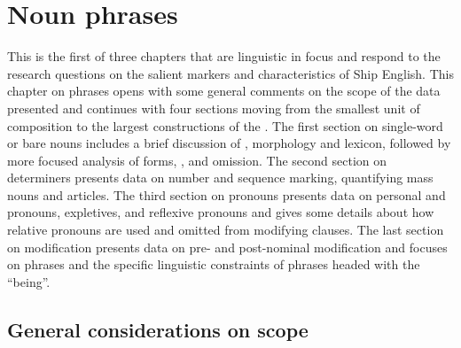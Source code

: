\chapter{{Noun phrases}}\label{sec:5}

This is the first of three chapters that are linguistic in focus and respond to the research questions on the salient markers and characteristics of Ship English. This chapter on  phrases opens with some general comments on the scope of the data presented and continues with four sections moving from the smallest unit of  composition to the largest constructions of the . The first section on single-word or bare nouns includes a brief discussion of , morphology and lexicon, followed by more focused analysis of  forms, , and  omission. The second section on determiners presents data on number and sequence marking, quantifying mass nouns and articles. The third section on pronouns presents data on personal and  pronouns, expletives,  and reflexive pronouns and gives some details about how relative pronouns are used and omitted from modifying clauses. The last section on  modification presents data on pre- and post-nominal modification and focuses on  phrases and the specific linguistic constraints of phrases headed with the  “being”. 

\section{{General considerations on scope}}\label{sec:5.1}

